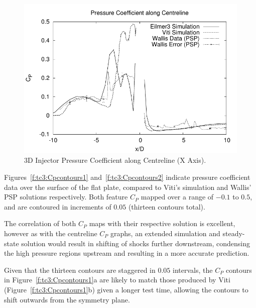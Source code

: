 %
%
\begin{figure}[htbp]
 \begin{center}
  \includegraphics[width=14cm]{./chap8-3Dinjector/figs/normalisedCP.pdf}
  \caption{3D Injector Pressure Coefficient along Centreline (X Axis).}
  \label{f:tc3:cpcentreline}
 \end{center}
\end{figure}
%

\newpage
Figures~\ref{f:tc3:Cpcontours1} and~\ref{f:tc3:Cpcontours2} indicate pressure coefficient data over the surface of the flat plate, compared to Viti's simulation and Wallis' PSP solutions respectively. Both feature $C_P$ mapped over a range of $-0.1$ to $0.5$, and are contoured in increments of $0.05$ (thirteen contours total).

The correlation of both $C_P$ maps with their respective solution is excellent, however as with the centreline $C_P$ graphs, an extended simulation and steady-state solution would result in shifting of shocks further downstream, condensing the high pressure regions upstream and resulting in a more accurate prediction. 

Given that the thirteen contours are staggered in $0.05$ intervals, the $C_P$ contours in Figure~\ref{f:tc3:Cpcontours1}a are likely to match those produced by Viti (Figure~\ref{f:tc3:Cpcontours1}b) given a longer test time, allowing the contours to shift outwards from the symmetry plane. 

